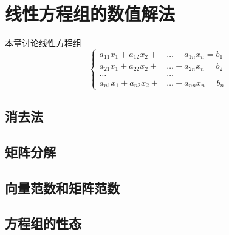 \chapter{线性方程组的数值解法}

本章讨论线性方程组
\begin{equation}
    \left\{
        \begin{aligned}
            a_{11}x_1+a_{12}x_2+&\ldots+a_{1n}x_n=b_1\\
            a_{21}x_1+a_{22}x_2+&\ldots+a_{2n}x_n=b_2\\
            \ldots&\ldots\\
            a_{n1}x_1+a_{n2}x_2+&\ldots+a_{nn}x_n=b_n
        \end{aligned}
    \right.
\end{equation}

\section{消去法}

\section{矩阵分解}

\section{向量范数和矩阵范数}

\section{方程组的性态}
